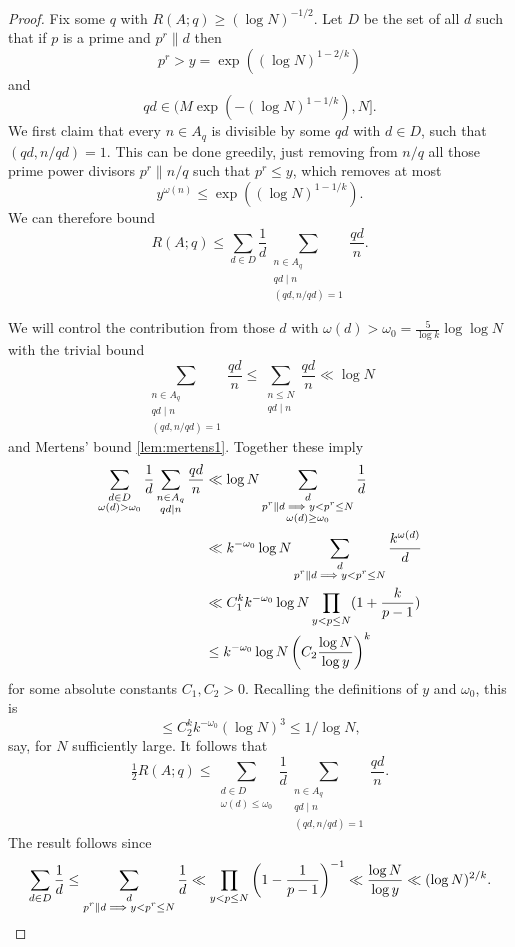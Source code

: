\begin{proof}
Fix some $q$ with $R(A;q)\geq (\log N)^{-1/2}$. Let $D$ be the set of all $d$ such that if $p$ is a prime and $p^r \| d$ then
\[p^r>y=\exp((\log N)^{1-2/k})\]
and
\[qd\in (M\exp(-(\log N)^{1-1/k}),N].\]
We first claim that every $n\in A_q$ is divisible by some $qd$ with $d\in D$, such that $(qd,n/qd)=1$. This can be done greedily, just removing from $n/q$ all those prime power divisors $p^r\| n/q$ such that $p^r\leq y$, which removes at most
\[y^{\omega(n)}\leq  \exp((\log N)^{1-1/k}).\]
We can therefore bound
\[R(A;q) \leq \sum_{d\in D}\frac{1}{d}\sum_{\substack{n\in A_q\\ qd\mid n\\ (qd,n/qd)=1}}\frac{qd}{n}.\]

We will control the contribution from those $d$ with $\omega(d)>\omega_0= \frac{5}{\log k}\log\log N$ with the trivial bound
\[\sum_{\substack{n\in A_q\\ qd\mid n\\ (qd,n/qd)=1}}\frac{qd}{n} \leq \sum_{\substack{n\leq N\\ qd\mid n}}\frac{qd}{n}\ll \log N\]
and Mertens' bound \ref{lem:mertens1}. Together these imply
\begin{align*}
\sum_{\substack{d\in D\\ \omega(d)>\omega_0}}\frac{1}{d}\sum_{\substack{n\in A_q\\ qd\mid n}}\frac{qd}{n}
&\ll \log N\sum_{\substack{d\\ p^r\| d\implies y<p^r\leq N\\ \omega(d)\geq \omega_0}} \frac{1}{d}\\
&\ll
k^{-\omega_0}\log N\sum_{\substack{d\\ p^r\| d\implies y<p^r\leq N}} \frac{k^{\omega(d)}}{d}\\
&\ll C_1^kk^{-\omega_0}\log N\prod_{y<p\leq N}(1+\frac{k}{p-1}) \\
 &\leq k^{-\omega_0}\log N\left( C_2\frac{\log N}{\log y}\right)^{k}
\end{align*}
for some absolute constants $C_1,C_2>0$. Recalling the definitions of $y$ and $\omega_0$, this is
\[\leq C_2^kk^{-\omega_0}(\log N)^3\leq 1/\log N,\]
say, for $N$ sufficiently large. It follows that
\[\tfrac{1}{2}R(A;q)\leq \sum_{\substack{d\in D\\ \omega(d)\leq \omega_0}}\frac{1}{d}\sum_{\substack{n\in A_q\\ qd\mid n\\ (qd,n/qd)=1}}\frac{qd}{n} .\]
The result follows since
\[\sum_{d\in D}\frac{1}{d}\leq \sum_{\substack{d\\ p^r\| d\implies y<p^r\leq N}}\frac{1}{d} \ll \prod_{y<p\leq N}\left( 1-\frac{1}{p-1}\right)^{-1}\ll \frac{\log N}{\log y}\ll (\log N)^{2/k}.\]
\end{proof}

